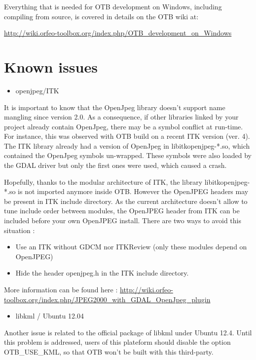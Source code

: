 Everything that is needed for OTB development on Windows, including compiling from source, is covered in details on the OTB wiki at:
\begin{center}
\url{http://wiki.orfeo-toolbox.org/index.php/OTB_development_on_Windows}
\end{center}

\section{Known issues}
\label{sec:knownissues}

\begin{itemize}
\item  openjpeg/ITK 
\end{itemize}

It is important to know that the OpenJpeg library doesn't support name mangling since version 2.0. 
As a consequence, if other libraries linked by your project already contain OpenJpeg, there may be a symbol conflict at run-time. 
For instance, this was observed with OTB build on a recent ITK version (ver. 4). 
The ITK library already had a version of OpenJpeg in libitkopenjpeg-*.so, which contained the OpenJpeg symbols un-wrapped.
These symbols were also loaded by the GDAL driver but only the first ones were used, which caused a crash. 

Hopefully, thanks to the modular architecture of ITK, the library libitkopenjpeg-*.so is not imported anymore inside OTB.
However the OpenJPEG headers may be present in ITK include directory. As the current architecture doesn't allow to tune 
include order between modules, the OpenJPEG header from ITK can be included before your own OpenJPEG install. There are
two ways to avoid this situation :
\begin{itemize}
\item Use an ITK without GDCM nor ITKReview (only these modules depend on OpenJPEG)
\item Hide the header openjpeg.h in the ITK include directory.
\end{itemize}

More information can be found here : \url{http://wiki.orfeo-toolbox.org/index.php/JPEG2000_with_GDAL_OpenJpeg_plugin}

\begin{itemize}
\item  libkml / Ubuntu 12.04 
\end{itemize}

Another issue is related to the official package of libkml under Ubuntu 12.4.
Until this problem is addressed, users of this plateform should disable the option OTB\_USE\_KML, so that OTB won't be built with this third-party.

